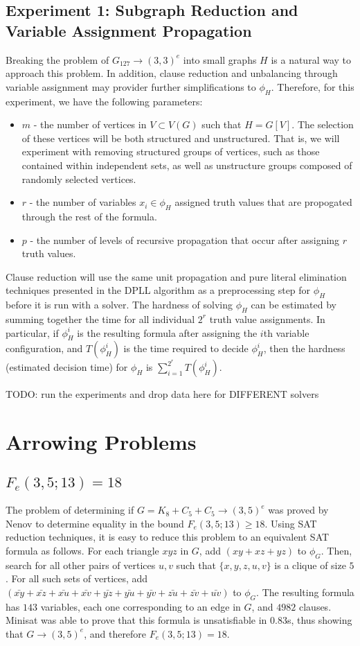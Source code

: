 \documentclass[paper=a4, fontsize=11pt]{scrartcl} %
\newcommand{\TODO}{{\color{red}TODO}}
\begin{document}
\subsection{Experiment 1: Subgraph Reduction and Variable Assignment Propagation}
Breaking the problem of $G_{127} \to (3,3)^e$ into small graphs $H$ is a natural way
to approach this problem. In addition, clause reduction and unbalancing through
variable assignment may provider further simplifications to $\phi_H$.
Therefore, for this experiment, we have the following parameters:
\begin{itemize}
	\item $m$ - the number of vertices in $V \subset V(G)$ such that $H = G[V]$. The selection of
	these vertices will be both structured and unstructured. That is, we will experiment
	with removing structured groups of vertices, such as those contained within independent 
	sets, as well as unstructure groups composed of randomly selected vertices.
	\item $r$ - the number of variables $x_i \in \phi_H$ assigned truth values that are
	propogated through the rest of the formula. 
	\item $p$ - the number of levels of recursive propagation that occur after assigning 
	$r$ truth values.
\end{itemize}
Clause reduction will use the same unit propagation and pure literal elimination techniques
presented in the DPLL algorithm as a preprocessing step for $\phi_H$ before it is run with a solver.
The hardness of solving $\phi_H$ can be estimated by summing together the time for
all individual $2^r$ truth value assignments. In particular, if $\phi_H^i$ is the
resulting formula after assigning the $i$th variable configuration, and $T(\phi_H^i)$ 
is the time required to decide $\phi_H^i$, then the hardness (estimated decision time)
for $\phi_H$ is $\sum_{i = 1}^{2^r} T(\phi_H^i)$.

\TODO: run the experiments and drop data here for DIFFERENT solvers

\section{Arrowing Problems}
\label{sec:arrowComputations}
\subsection{$F_e(3,5;13) = 18$}
The problem of determining if $G = K_8 + C_5 + C_5 \to (3,5)^e$ was proved by Nenov \cite{Nenov83-1}
to determine equality in the bound $F_e(3,5;13) \geq 18$. Using SAT reduction techniques, it is easy to
reduce this problem to an equivalent SAT formula as follows. For each triangle $xyz$ in $G$, add
$(xy + xz + yz)$ to $\phi_G$. Then, search for all other pairs of vertices $u,v$ such that $\{x,y,z,u,v\}$ is a clique
of size $5$. For all such sets of vertices, add $(\bar{xy} + \bar{xz} + \bar{xu} + \bar{xv} + \bar{yz} + \bar{yu} + \bar{yv} + \bar{zu} + \bar{zv} + \bar{uv})$
to $\phi_G$. The resulting formula has $143$ variables, each one corresponding to an edge in $G$,
and $4982$ clauses. Minisat was able to prove that this formula is unsatisfiable in 0.83s, thus
showing that $G \to (3,5)^e$, and therefore $F_e(3,5;13) = 18$.
\end{document}
